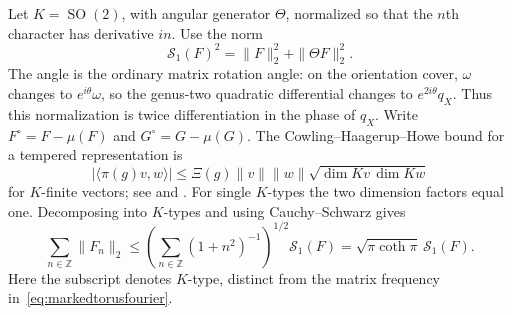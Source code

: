 \documentclass[11pt,a4paper]{article}
\numberwithin{equation}{section}
\theoremstyle{definition}
\theoremstyle{remark}
\newcommand{\ZZ}{\mathbb Z}
\begin{document}
Let $K=\operatorname{SO}(2)$, with angular generator $\Theta$,
normalized so that the $n$th character has derivative $in$.
Use the norm
\begin{equation}
 \mathcal S_1(F)^2=\|F\|_2^2+\|\Theta F\|_2^2.
 \label{eq:markedtorusKnorm}
\end{equation}
The angle is the ordinary matrix rotation angle: on the orientation
cover, $\omega$ changes to $e^{i\theta}\omega$, so the genus-two
quadratic differential changes to $e^{2i\theta}q_X$. Thus this
normalization is twice differentiation in the phase of $q_X$.
Write $F^\circ=F-\mu(F)$ and $G^\circ=G-\mu(G)$.
The Cowling--Haagerup--Howe bound for a tempered representation is
\[
 |\langle\pi(g)v,w\rangle|
 \leq\Xi(g)\|v\|\|w\|
       \sqrt{\dim Kv\,\dim Kw}
\]
for $K$-finite vectors; see
\cite[Proposition 2.6]{BenoistKobayashi} and
\cite{CowlingHaagerupHowe}. For single $K$-types the two
dimension factors equal one. Decomposing into $K$-types and
using Cauchy--Schwarz gives
\[
 \sum_{n\in\ZZ}\|F_n\|_2
 \leq\left(\sum_{n\in\ZZ}(1+n^2)^{-1}\right)^{1/2}
       \mathcal S_1(F)
 =\sqrt{\pi\coth\pi}\,\mathcal S_1(F).
\]
Here the subscript denotes $K$-type, distinct from the matrix
frequency in~\eqref{eq:markedtorusfourier}.
\end{document}
